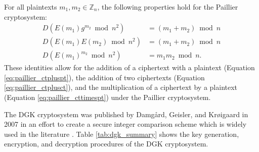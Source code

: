 

For all plaintexts $m_1,m_2 \in \mathbb{Z}_n$, the following properties hold for the Paillier cryptosystem:
\begin{align}
  D(E(m_1)g^{m_2}\bmod n^2) &=(m_1+m_2)\bmod n \label{eq:paillier_ctpluspt} \\ 
  D(E(m_1)E(m_2)\bmod n^2) &=(m_1+m_2)\bmod n \label{eq:paillier_ctplusct} \\ 
  D(E(m_1)^{m_2}\bmod n^2) &= m_1m_2\bmod n. \label{eq:paillier_cttimespt}
\end{align}
These identities allow for the addition of a ciphertext with a plaintext (Equation \ref{eq:paillier_ctpluspt}), the addition of two ciphertexts (Equation \ref{eq:paillier_ctplusct}), and the multiplication of a ciphertext by a plaintext (Equation \ref{eq:paillier_cttimespt}) under the Paillier cryptosystem.

The DGK cryptosystem was published by Damg{\aa}rd, Geisler, and Kr{\o}igaard in 2007 in an effort to create a secure integer comparison scheme \cite{pieprzyk_efficient_2007, cryptoeprint:2008:321} which is widely used in the literature \cite{veugen_improving_2012}.
Table \ref{tab:dgk_summary} shows the key generation, encryption, and decryption procedures of the DGK cryptosystem. 


